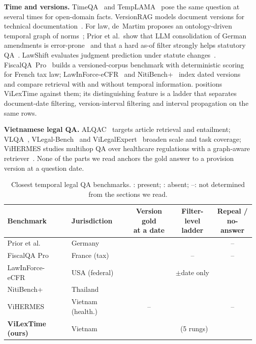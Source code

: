 \documentclass[conference]{IEEEtran}
\newcommand{\cmark}{\textcolor{cGreen}{\ding{51}}}
\newcommand{\xmark}{\textcolor{cVerm}{\ding{55}}}
\begin{document}
\textbf{Time and versions.} TimeQA~\cite{chen2021timeqa} and TempLAMA~\cite{dhingra2022templama} pose the same question at several times for open-domain facts. VersionRAG models document versions for technical documentation~\cite{huwiler2025versionrag}. For law, de~Martim proposes an ontology-driven temporal graph of norms~\cite{demartim2025satgraph}; Prior et al.\ show that LLM consolidation of German amendments is error-prone~\cite{prior2025consolidation} and that a hard as-of filter strongly helps statutory QA~\cite{prior2026oldfriend}. LawShift evaluates judgment prediction under statute changes~\cite{han2025lawshift}. FiscalQA~Pro~\cite{cymbler2026fiscalqa} builds a versioned-corpus benchmark with deterministic scoring for French tax law; LawInForce-eCFR~\cite{yao2026lawinforce} and NitiBench+~\cite{akarajaradwong2026nitibenchplus} index dated versions and compare retrieval with and without temporal information.  positions ViLexTime against them; its distinguishing feature is a ladder that separates document-date filtering, version-interval filtering and interval propagation on the same rows.

\textbf{Vietnamese legal QA.} ALQAC~\cite{thanh2021alqac} targets article retrieval and entailment; VLQA~\cite{nguyen2025vlqa}, VLegal-Bench~\cite{dong2026vietlegal} and ViLegalExpert~\cite{nguyen2026vilegalexpert} broaden scale and task coverage; ViHERMES studies multihop QA over healthcare regulations with a graph-aware retriever~\cite{nguyen2026vihermes}. None of the parts we read anchors the gold answer to a provision version at a question date.

\begin{table}[t]
\centering
\caption{Closest temporal legal QA benchmarks. \cmark: present; \xmark: absent; --: not determined from the sections we read.}
\label{tab:related}
\setlength{\tabcolsep}{2.4pt}
\scriptsize
\begin{tabular}{@{}l l c c c@{}}
\toprule
Benchmark & Jurisdiction & \makecell{Version gold\\at a date} & \makecell{Filter-level\\ladder} & \makecell{Repeal /\\no-answer} \\
\midrule
Prior et al.~\cite{prior2026oldfriend} & Germany & \cmark & \xmark & -- \\
FiscalQA Pro~\cite{cymbler2026fiscalqa} & France (tax) & \cmark & -- & -- \\
LawInForce-eCFR~\cite{yao2026lawinforce} & USA (federal) & \cmark & $\pm$date only & \xmark \\
NitiBench+~\cite{akarajaradwong2026nitibenchplus} & Thailand & \cmark & \xmark & \cmark \\
ViHERMES~\cite{nguyen2026vihermes} & Vietnam (health.) & -- & \xmark & -- \\
\midrule
\textbf{ViLexTime (ours)} & Vietnam & \cmark & \cmark\ (5 rungs) & \cmark \\
\bottomrule
\end{tabular}
\end{table}
\end{document}
